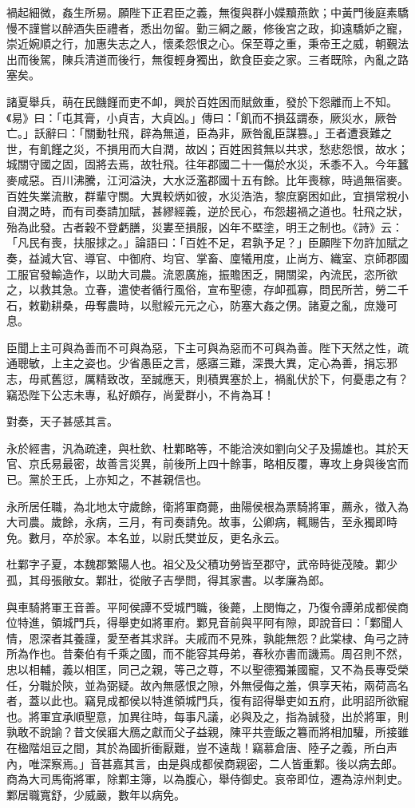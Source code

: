 \begin{pinyinscope}
禍起細微，姦生所易。願陛下正君臣之義，無復與群小媟黷燕飲；中黃門後庭素驕慢不謹嘗以醉酒失臣禮者，悉出勿留。勤三綱之嚴，修後宮之政，抑遠驕妒之寵，崇近婉順之行，加惠失志之人，懷柔怨恨之心。保至尊之重，秉帝王之威，朝覲法出而後駕，陳兵清道而後行，無復輕身獨出，飲食臣妾之家。三者既除，內亂之路塞矣。

諸夏舉兵，萌在民饑饉而吏不卹，興於百姓困而賦斂重，發於下怨離而上不知。《易》曰：「屯其膏，小貞吉，大貞凶。」傳曰：「飢而不損茲謂泰，厥災水，厥咎亡。」訞辭曰：「關動牡飛，辟為無道，臣為非，厥咎亂臣謀篡。」王者遭衰難之世，有飢饉之災，不損用而大自潤，故凶；百姓困貧無以共求，愁悲怨恨，故水；城關守國之固，固將去焉，故牡飛。往年郡國二十一傷於水災，禾黍不入。今年蠶麥咸惡。百川沸騰，江河溢決，大水泛濫郡國十五有餘。比年喪稼，時過無宿麥。百姓失業流散，群輩守關。大異較炳如彼，水災浩浩，黎庶窮困如此，宜損常稅小自潤之時，而有司奏請加賦，甚繆經義，逆於民心，布怨趨禍之道也。牡飛之狀，殆為此發。古者穀不登虧膳，災婁至損服，凶年不塈塗，明王之制也。《詩》云：「凡民有喪，扶服捄之。」論語曰：「百姓不足，君孰予足？」臣願陛下勿許加賦之奏，益減大官、導官、中御府、均官、掌畜、廩犧用度，止尚方、織室、京師郡國工服官發輸造作，以助大司農。流恩廣施，振贍困乏，開關梁，內流民，恣所欲之，以救其急。立春，遣使者循行風俗，宣布聖德，存卹孤寡，問民所苦，勞二千石，敕勸耕桑，毋奪農時，以慰綏元元之心，防塞大姦之侽。諸夏之亂，庶幾可息。

臣聞上主可與為善而不可與為惡，下主可與為惡而不可與為善。陛下天然之性，疏通聰敏，上主之姿也。少省愚臣之言，感寤三難，深畏大異，定心為善，捐忘邪志，毋貳舊愆，厲精致改，至誠應天，則積異塞於上，禍亂伏於下，何憂患之有？竊恐陛下公志未專，私好頗存，尚愛群小，不肯為耳！

對奏，天子甚感其言。

永於經書，汎為疏達，與杜欽、杜鄴略等，不能洽浹如劉向父子及揚雄也。其於天官、京氏易最密，故善言災異，前後所上四十餘事，略相反覆，專攻上身與後宮而已。黨於王氏，上亦知之，不甚親信也。

永所居任職，為北地太守歲餘，衛將軍商薨，曲陽侯根為票騎將軍，薦永，徵入為大司農。歲餘，永病，三月，有司奏請免。故事，公卿病，輒賜告，至永獨即時免。數月，卒於家。本名並，以尉氏樊並反，更名永云。

杜鄴字子夏，本魏郡繁陽人也。祖父及父積功勞皆至郡守，武帝時徙茂陵。鄴少孤，其母張敞女。鄴壯，從敞子吉學問，得其家書。以孝廉為郎。

與車騎將軍王音善。平阿侯譚不受城門職，後薨，上閔悔之，乃復令譚弟成都侯商位特進，領城門兵，得舉吏如將軍府。鄴見音前與平阿有隙，即說音曰：「鄴聞人情，恩深者其養謹，愛至者其求詳。夫戚而不見殊，孰能無怨？此棠棣、角弓之詩所為作也。昔秦伯有千乘之國，而不能容其母弟，春秋亦書而譏焉。周召則不然，忠以相輔，義以相匡，同己之親，等己之尊，不以聖德獨兼國寵，又不為長專受榮任，分職於陝，並為弼疑。故內無感恨之隙，外無侵侮之羞，俱享天祐，兩荷高名者，蓋以此也。竊見成都侯以特進領城門兵，復有詔得舉吏如五府，此明詔所欲寵也。將軍宜承順聖意，加異往時，每事凡議，必與及之，指為誠發，出於將軍，則孰敢不說諭？昔文侯寤大鴈之獻而父子益親，陳平共壹飯之篹而將相加驩，所接雖在楹階俎豆之間，其於為國折衝厭難，豈不遠哉！竊慕倉唐、陸子之義，所白声內，唯深察焉。」音甚嘉其言，由是與成都侯商親密，二人皆重鄴。後以病去郎。商為大司馬衛將軍，除鄴主簿，以為腹心，舉侍御史。哀帝即位，遷為涼州刺史。鄴居職寬舒，少威嚴，數年以病免。


\end{pinyinscope}
